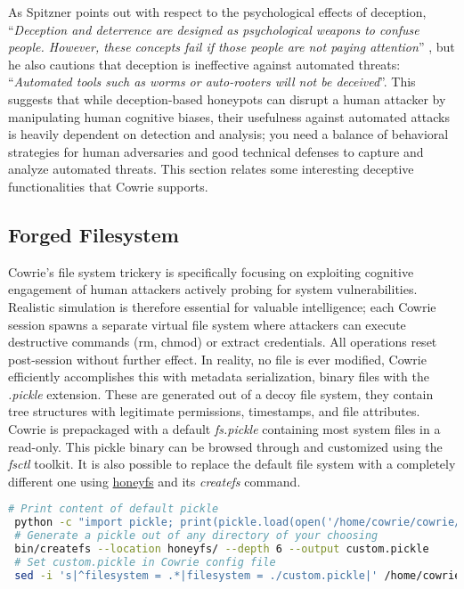\documentclass{cls/ULBreport}
\begin{document}
As Spitzner points out with respect to the psychological effects of deception, \enquote{\textit{Deception and deterrence are designed as psychological weapons to confuse people. However, these concepts fail if those people are not paying attention}} \autocite[Ch.~4, p.~73]{spitzner2002honeypots}, but he also cautions that deception is ineffective against automated threats: \enquote{\textit{Automated tools such as worms or auto-rooters will not be deceived}}\autocite[Ch.~9, p.~197]{spitzner2002honeypots}. This suggests that while deception-based honeypots can disrupt a human attacker by manipulating human cognitive biases, their usefulness against automated attacks is heavily dependent on detection and analysis; you need a balance of behavioral strategies for human adversaries and good technical defenses to capture and analyze automated threats. This section relates some interesting deceptive functionalities that Cowrie supports.

    \subsection{Forged Filesystem}
Cowrie's file system trickery is specifically focusing on exploiting cognitive engagement of human attackers actively probing for system vulnerabilities. Realistic simulation is therefore essential for valuable intelligence; each Cowrie session spawns a separate virtual file system where attackers can execute destructive commands (rm, chmod) or extract credentials. All operations reset post-session without further effect. In reality, no file is ever modified, Cowrie efficiently accomplishes this with metadata serialization, binary files with the \textit{.pickle} extension. These are generated out of a decoy file system, they contain tree structures with legitimate permissions, timestamps, and file attributes. Cowrie is prepackaged with a default \textit{fs.pickle} containing most system files in a read-only. This pickle binary can be browsed through and customized using the \textit{fsctl} toolkit. It is also possible to replace the default file system with a completely different one using \href{https://github.com/cowrie/cowrie/blob/main/docs/HONEYFS.rst}{honeyfs} and its \textit{createfs} command.
 \begin{lstlisting}[language=bash,caption={Deceptive Filesystem Manipulation}]
 # Print content of default pickle 
 python -c "import pickle; print(pickle.load(open('/home/cowrie/cowrie/data/fs.pickle','rb')))" 
 # Generate a pickle out of any directory of your choosing
 bin/createfs --location honeyfs/ --depth 6 --output custom.pickle  
 # Set custom.pickle in Cowrie config file 
 sed -i 's|^filesystem = .*|filesystem = ./custom.pickle|' /home/cowrie/cowrie/etc/cowrie.cfg\end{lstlisting}
\end{document}
